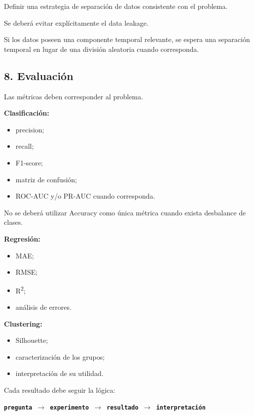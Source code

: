 \documentclass[11pt,a4paper]{article}
\begin{document}
Definir una estrategia de separación de datos consistente con el problema.

Se deberá evitar explícitamente el data leakage.

Si los datos poseen una componente temporal relevante, se espera una separación temporal en
lugar de una división aleatoria cuando corresponda.

\subsection{8. Evaluación}

Las métricas deben corresponder al problema.

\textbf{Clasificación:}

\begin{itemize}
  \item precision;
  \item recall;
  \item F1-score;
  \item matriz de confusión;
  \item ROC-AUC y/o PR-AUC cuando corresponda.
\end{itemize}

No se deberá utilizar Accuracy como única métrica cuando exista desbalance de clases.

\textbf{Regresión:}

\begin{itemize}
  \item MAE;
  \item RMSE;
  \item R\textsuperscript{2};
  \item análisis de errores.
\end{itemize}

\textbf{Clustering:}

\begin{itemize}
  \item Silhouette;
  \item caracterización de los grupos;
  \item interpretación de su utilidad.
\end{itemize}

Cada resultado debe seguir la lógica:

\begin{center}
  \texttt{\textbf{pregunta $\rightarrow$ experimento $\rightarrow$ resultado $\rightarrow$ interpretación}}
\end{center}
\end{document}
